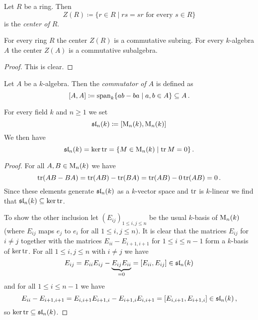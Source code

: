 \begin{definition}
  Let $R$ be a ring. Then
  \[
              Z(R)
    \coloneqq \{
                r \in R
              \mid
                rs = sr
                \text{ for every }
                s \in R
              \}
  \]
  is the \emph{center of $R$}.
\end{definition}


\begin{lemma}
  For every ring $R$ the center $Z(R)$ is a commutative subring.
  For every $k$-algebra $A$ the center $Z(A)$ is a commutative subalgebra.
\end{lemma}
\begin{proof}
  This is clear.
\end{proof}


\begin{definition}
  Let $A$ be a $k$-algebra.
  Then the \emph{commutator of $A$} is defined as
  \[
              [A,A]
    \coloneqq \operatorname{span}_k  \{
                          ab - ba
                        \mid
                          a, b \in A
                        \}
    \subseteq A \,.
  \]
\end{definition}


\begin{example}
  For every field $k$ and $n \geq 1$ we set
  \[
    \operatorname{\mathfrak{sl}}_n(k) \coloneqq [\operatorname{M}_n(k), \operatorname{M}_n(k)]
  \]
  We then have
  \[
      \operatorname{\mathfrak{sl}}_n(k)
    = \ker \operatorname{tr}
    = \{
        M \in \operatorname{M}_n(k)
      \mid
        \operatorname{tr} M = 0
      \} \,.
  \]
  \begin{proof}
    For all $A, B \in \operatorname{M}_n(k)$ we have
    \[
        \operatorname{tr}(AB - BA)
      = \operatorname{tr}(AB) - \operatorname{tr}(BA)
      = \operatorname{tr}(AB) -0\operatorname{tr}(AB)
      = 0 \,.
    \]
    Since these elements generate $\operatorname{\mathfrak{sl}}_n(k)$ as a $k$-vector space and $\operatorname{tr}$ is $k$-linear we find that $\operatorname{\mathfrak{sl}}_n(k) \subseteq \ker \operatorname{tr}$.
    
    To show the other inclusion let $(E_{ij})_{1 \leq i,j \leq n}$ be the usual $k$-basis of $\operatorname{M}_n(k)$ (where $E_{ij}$ maps $e_j$ to $e_i$ for all $1 \leq i,j \leq n)$.
    It is clear that the matrices $E_{ij}$ for $i \neq j$ together with the matrices $E_{ii}-E_{i+1,i+1}$ for $1 \leq i \leq n-1$ form a $k$-basis of $\ker \operatorname{tr}$.
    For all $1 \leq i,j \leq n$ with $i \neq j$ we have
    \[
          E_{ij}
      =   E_{ii} E_{ij} - \underbrace{E_{ij} E_{ii}}_{=0}
      =   [E_{ii}, E_{ij}]
      \in \operatorname{\mathfrak{sl}}_n(k)
    \]
    and for all $1 \leq i \leq n-1$ we have
    \[
          E_{ii} - E_{i+1,i+1}
      =   E_{i,i+1} E_{i+1,i} - E_{i+1,i} E_{i,i+1}
      =   [E_{i,i+1}, E_{i+1,i}]
      \in \operatorname{\mathfrak{sl}}_n(k) \,,
    \]
    so $\ker \operatorname{tr} \subseteq \operatorname{\mathfrak{sl}}_n(k)$.
  \end{proof}
\end{example}


